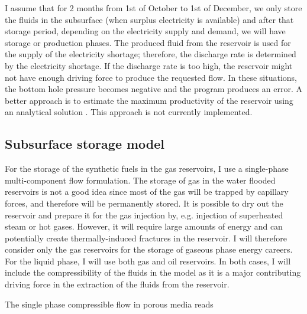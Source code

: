 \documentclass{ECOS_2021}
\begin{document}
I assume that for 2 months from 1st of October to 1st of December,
we only store the fluids in the subsurface (when surplus electricity
is available) and after that storage period, depending on the electricity
supply and demand, we will have storage or production phases. The produced
fluid from the reservoir is used for the supply of the electricity
shortage; therefore, the discharge rate is determined by the electricity
shortage. If the discharge rate is too high, the reservoir might
not have enough driving force to produce the requested flow. In these
situations, the bottom hole pressure becomes negative and the program
produces an error. A better approach is to estimate the maximum productivity
of the reservoir using an analytical solution \cite{hagoortFundamentalsGasReservoir1988,al-hussainyApplicationRealGas1966,al-hussainyFlowRealGases1966}.
This approach is not currently implemented. 


\sffamily \subsection{Subsurface storage model}
\normalsize
For the storage of the synthetic fuels in the gas
reservoirs, I use a single-phase multi-component flow formulation.
The storage of gas in the water flooded reservoirs is not a good idea
since most of the gas will be trapped by capillary forces, and therefore
will be permanently stored. It is possible to dry out the reservoir
and prepare it for the gas injection by, e.g. injection of superheated
steam or hot gases. However, it will require large amounts of energy
and can potentially create thermally-induced fractures in the reservoir.
I will therefore consider only the gas reservoirs for the storage
of gaseous phase energy careers. For the liquid phase, I will use
both gas and oil reservoirs. In both cases, I will include the compressibility
of the fluids in the model as it is a major contributing driving force
in the extraction of the fluids from the reservoir.

The single phase compressible flow in porous media reads
\end{document}
